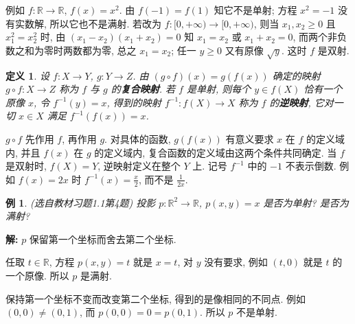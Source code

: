 \documentclass[UTF8,openany]{ctexbook}
\theoremstyle{chinesetextbook}
\newtheorem{definition}{定义}[section]
\newtheorem{example}{例}[section]
\newenvironment{cnsolution}{\par\indent\textbf{解:} \ignorespaces}{\par}
\begin{document}
例如 $f:\mathbb R\to\mathbb R$, $f(x)=x^2$. 由 $f(-1)=f(1)$ 知它不是单射; 方程 $x^2=-1$ 没有实数解, 所以它也不是满射. 若改为 $f:[0,+\infty)\to[0,+\infty)$, 则当 $x_1,x_2\ge0$ 且 $x_1^2=x_2^2$ 时, 由 $(x_1-x_2)(x_1+x_2)=0$ 知 $x_1=x_2$ 或 $x_1+x_2=0$, 而两个非负数之和为零时两数都为零, 总之 $x_1=x_2$; 任一 $y\ge0$ 又有原像 $\sqrt y$. 这时 $f$ 是双射.
\begin{definition}
设 $f:X\to Y$, $g:Y\to Z$. 由 $(g\circ f)(x)=g(f(x))$ 确定的映射 $g\circ f:X\to Z$ 称为 $f$ 与 $g$ 的\textbf{复合映射}. 若 $f$ 是单射, 则每个 $y\in f(X)$ 恰有一个原像 $x$, 令 $f^{-1}(y)=x$, 得到的映射 $f^{-1}:f(X)\to X$ 称为 $f$ 的\textbf{逆映射}, 它对一切 $x\in X$ 满足 $f^{-1}(f(x))=x$.
\end{definition}
$g\circ f$ 先作用 $f$, 再作用 $g$. 对具体的函数, $g(f(x))$ 有意义要求 $x$ 在 $f$ 的定义域内, 并且 $f(x)$ 在 $g$ 的定义域内, 复合函数的定义域由这两个条件共同确定. 当 $f$ 是双射时, $f(X)=Y$, 逆映射定义在整个 $Y$ 上. 记号 $f^{-1}$ 中的 $-1$ 不表示倒数. 例如 $f(x)=2x$ 时 $\displaystyle f^{-1}(x)=\frac x2$, 而不是 $\displaystyle\frac1{2x}$.
\begin{example}
\textnormal{(选自教材习题1.1第4题)} 投影 $p:\mathbb R^2\to\mathbb R$, $p(x,y)=x$ 是否为单射? 是否为满射?
\end{example}
\begin{cnsolution}
$p$ 保留第一个坐标而舍去第二个坐标.

任取 $t\in\mathbb R$, 方程 $p(x,y)=t$ 就是 $x=t$, 对 $y$ 没有要求, 例如 $(t,0)$ 就是 $t$ 的一个原像. 所以 $p$ 是满射.

保持第一个坐标不变而改变第二个坐标, 得到的是像相同的不同点. 例如 $(0,0)\ne(0,1)$, 而 $p(0,0)=0=p(0,1)$. 所以 $p$ 不是单射.
\end{cnsolution}
\end{document}
